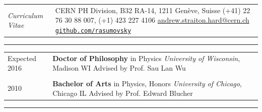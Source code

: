 \documentclass{letter}
\begin{document}
 

\begin{tabular}{p{}p{}}
	\hfill \newline \href{https://ch.linkedin.com/in/andrew-hard-25b690a5}{\Huge{\color{Maroon}{Andrew Hard}}} \newline \LARGE{\textit{Curriculum Vitae}} \newline
	&
	\hfill \newline CERN PH Division, B32 RA-14, 1211 Gen\`{e}ve, Suisse \newline
	(+41) 22 76 30 88 007, (+1) 423 227 4106 \newline
	\href{mailto:ahard@cern.ch}{andrew.straiton.hard@cern.ch} \newline
	\href{https://github.com/rasumovsky}{\texttt{github.com/rasumovsky}}\\
\end{tabular}

\begin{flushleft}
\Large{\textsc{\textbf{\color{Maroon}{Education}}}}
\hrule
\end{flushleft}

\begin{tabular}{p{}p{}}
	Expected 2016
	&
	\textbf{Doctor of Philosophy} in Physics \newline 
	\textit{University of Wisconsin}, Madison WI \newline
	Advised by Prof. Sau Lan Wu \\
\\
	2010 
	& 
	\textbf{Bachelor of Arts} in Physics, Honors \newline 
	\textit{University of Chicago}, Chicago IL \newline
	Advised by Prof. Edward Blucher 
\\
\end{tabular}

\begin{flushleft}
\Large{\textsc{\textbf{\color{Maroon}{Experience}}}}
\hrule
\end{flushleft}
\end{document}
